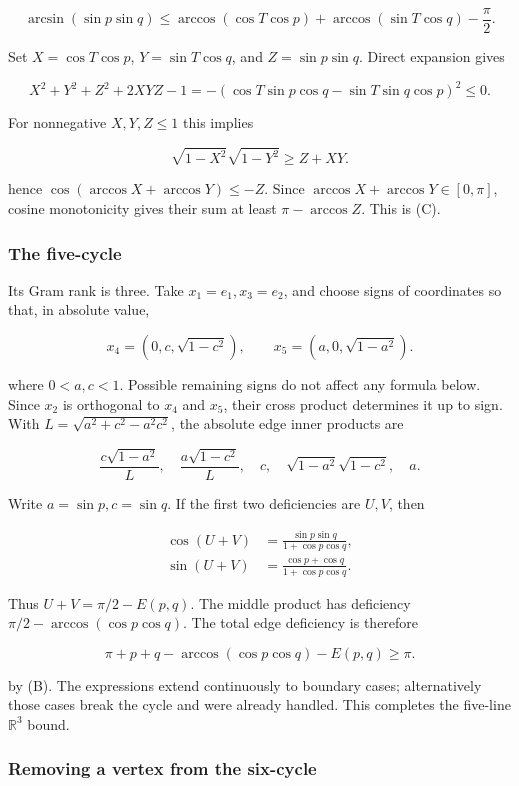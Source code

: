\documentclass[11pt,a4paper]{article}
\begin{document}
\[
\arcsin(\sin p\sin q)\le\arccos(\cos T\cos p)+\arccos(\sin T\cos q)-\frac{\pi}{2}.\tag{C}
\]

Set \(X=\cos T\cos p\), \(Y=\sin T\cos q\), and \(Z=\sin p\sin q\). Direct expansion gives

\[
X^2+Y^2+Z^2+2XYZ-1=-(\cos T\sin p\cos q-\sin T\sin q\cos p)^2\le0.
\]

For nonnegative \(X,Y,Z\le1\) this implies

\[
\sqrt{1-X^2}\sqrt{1-Y^2}\ge Z+XY.
\]

hence \(\cos(\arccos X+\arccos Y)\le-Z\). Since \(\arccos X+\arccos Y\in[0,\pi]\), cosine monotonicity gives their sum at least \(\pi-\arccos Z\). This is (C).

\subsubsection{The five-cycle}\label{the-five-cycle}

Its Gram rank is three. Take \(x_1=e_1,x_3=e_2\), and choose signs of coordinates so that, in absolute value,

\[
x_4=(0,c,\sqrt{1-c^2}),\qquad x_5=(a,0,\sqrt{1-a^2}).
\]

where \(0<a,c<1\). Possible remaining signs do not affect any formula below. Since \(x_2\) is orthogonal to \(x_4\) and \(x_5\), their cross product determines it up to sign. With \(L=\sqrt{a^2+c^2-a^2c^2}\), the absolute edge inner products are

\[
\frac{c\sqrt{1-a^2}}{L},\quad\frac{a\sqrt{1-c^2}}{L},\quad c,\quad\sqrt{1-a^2}\sqrt{1-c^2},\quad a.
\]

Write \(a=\sin p,c=\sin q\). If the first two deficiencies are \(U,V\), then

\[
\begin{aligned}\cos(U+V)&=\frac{\sin p\sin q}{1+\cos p\cos q},\\\sin(U+V)&=\frac{\cos p+\cos q}{1+\cos p\cos q}.\end{aligned}
\]

Thus \(U+V=\pi/2-E(p,q)\). The middle product has deficiency \(\pi/2-\arccos(\cos p\cos q)\). The total edge deficiency is therefore

\[
\pi+p+q-\arccos(\cos p\cos q)-E(p,q)\ge\pi.
\]

by (B). The expressions extend continuously to boundary cases; alternatively those cases break the cycle and were already handled. This completes the five-line \(\mathbb R^3\) bound.

\subsubsection{Removing a vertex from the six-cycle}\label{removing-a-vertex-from-the-six-cycle}
\end{document}
